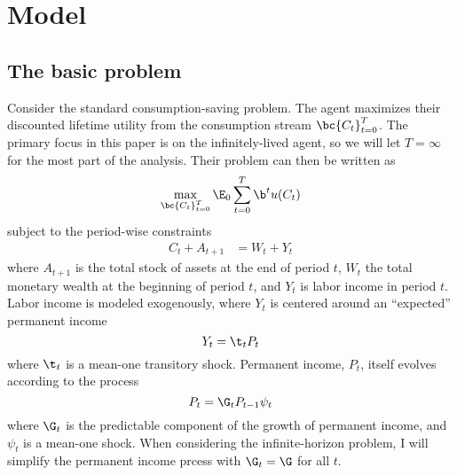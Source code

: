 \section{Model}\label{model}

\subsection{The basic problem}

Consider the standard consumption-saving problem. The agent maximizes their discounted lifetime utility from the consumption stream $\bc{C_{t}}_{t=0}^{T}$. The primary focus in this paper is on the infinitely-lived agent, so we will let $T = \infty$ for the most part of the analysis. Their problem can then be written as
\begin{equation}\label{eq:prb}
    \max_{\bc{C_t}_{t=0}^{T}}\E_{0}\sum_{t=0}^{T}\b^t u(C_t)
 \end{equation}
 subject to the period-wise constraints
\begin{align*}
    C_{t} + A_{t+1} &= W_{t} + Y_{t}
\end{align*}
where $A_{t+1}$ is the total stock of assets at the end of period $t$, $W_{t}$ the total monetary wealth at the beginning of period $t$, and $Y_{t}$ is labor income in period $t$. Labor income is modeled exogenously, where $Y_t$ is centered around an ``expected'' permanent income
\begin{equation}\label{eq:inc}
    Y_t = \t_t P_t
\end{equation}
where $\t_t$ is a mean-one transitory shock. Permanent income, $P_t$, itself evolves according to the process
\begin{equation}\label{eq:perm_inc}
    P_t = \G_t P_{t-1} \psi_t
\end{equation}
where $\G_t$ is the predictable component of the growth of permanent income, and $\psi_t$ is a mean-one shock. When considering the infinite-horizon problem, I will simplify the permanent income prcess with $\G_t = \G$ for all $t$.

